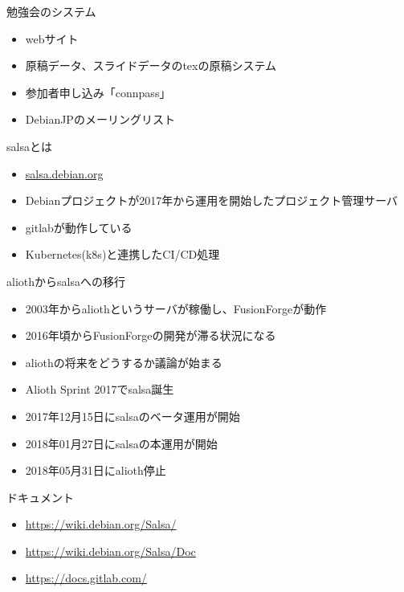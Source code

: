 
\begin{frame}[containsverbatim]{勉強会のシステム}
  \begin{itemize}
  \item webサイト
  \item 原稿データ、スライドデータのtexの原稿システム
  \item 参加者申し込み「connpass」
  \item DebianJPのメーリングリスト
  \end{itemize}
\end{frame}


\begin{frame}[containsverbatim]{salsaとは}
  \begin{itemize}
  \item \url{salsa.debian.org}
  \item Debianプロジェクトが2017年から運用を開始したプロジェクト管理サーバ
  \item gitlabが動作している
  \item Kubernetes(k8s)と連携したCI/CD処理
  \end{itemize}
\end{frame}

\begin{frame}[containsverbatim]{aliothからsalsaへの移行}
  \begin{itemize}
  \item 2003年からaliothというサーバが稼働し、FusionForgeが動作
  \item 2016年頃からFusionForgeの開発が滞る状況になる
  \item aliothの将来をどうするか議論が始まる
  \item Alioth Sprint 2017でsalsa誕生
  \item 2017年12月15日にsalsaのベータ運用が開始
  \item 2018年01月27日にsalsaの本運用が開始
  \item 2018年05月31日にalioth停止
  \end{itemize}
\end{frame}


\begin{frame}[containsverbatim]{ドキュメント}
  \begin{itemize}
  \item \url{https://wiki.debian.org/Salsa/}
  \item \url{https://wiki.debian.org/Salsa/Doc}
  \item \url{https://docs.gitlab.com/}
  \end{itemize}
\end{frame}

